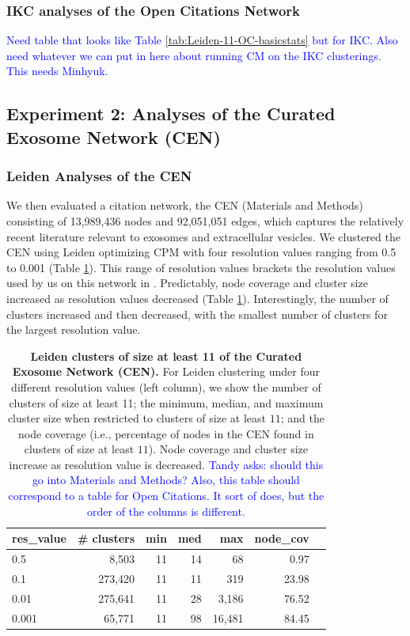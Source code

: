 \documentclass[11pt]{article}   	%
\begin{document}
\subsubsection{IKC analyses of the Open Citations Network}

\textcolor{blue}{Need table that looks like Table \ref{tab:Leiden-11-OC-basicstats} but for IKC. Also need whatever we can put in here about running CM on the IKC clusterings. This needs Minhyuk.}
\subsection{Experiment 2: Analyses of the Curated Exosome Network (CEN)}

\subsubsection{Leiden Analyses of the CEN}

We then evaluated a citation network, the CEN (Materials and Methods) consisting of 13,989,436 nodes and 92,051,051 edges, which captures the relatively recent literature relevant to exosomes and extracellular vesicles. We clustered the CEN using Leiden optimizing CPM with  four resolution values ranging from 0.5 to 0.001 (Table \ref{tab:CEN-table1}). This range of resolution values brackets the resolution values used by us on this network in   \cite{Jakatdar_2022}.
Predictably, node coverage and cluster size increased as resolution values  decreased (Table \ref{tab:CEN-table1}).
Interestingly, the number of clusters increased and then decreased, with the smallest number of clusters for the largest
resolution value.


\begin{table}[ht]
\centering
\begin{tabular}{lrrrrrr}
  \hline
 res\_value & \# clusters & min & med & max & node\_cov \\
  \hline
  0.5 &   8,503 & 11 & 14 & 68 & 0.97 \\
 0.1 &   273,420 & 11 & 11 & 319 & 23.98 \\
   0.01   & 275,641 & 11 & 28 & 3,186 & 76.52 \\
  0.001   &65,771 & 11 & 98 & 16,481 & 84.45 \\
   \hline
\end{tabular}
\caption{\textbf{Leiden clusters of size at least 11 of the Curated Exosome Network (CEN).}
For Leiden clustering under four different resolution values (left column), we show  the number of clusters of size at least 11;  the minimum, median, and
maximum cluster size when restricted to clusters of size at least $11$; and the node coverage (i.e., percentage of nodes in the CEN found in clusters of size at least $11$).
Node coverage and cluster size increase as resolution value is decreased.
\textcolor{blue}{Tandy asks: should this go into Materials and Methods? Also, this table should correspond to a table for Open Citations. It sort of does, but the
order of the columns is different. }
}
\label{tab:CEN-table1}
\end{table}
\end{document}
